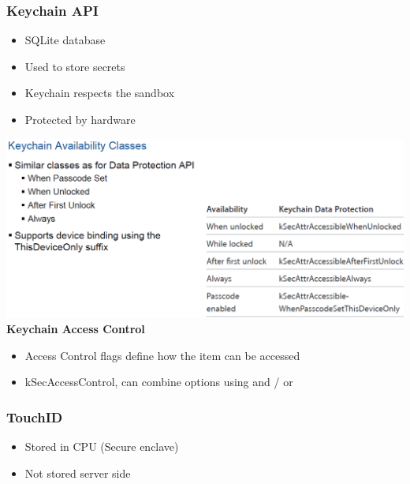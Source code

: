 \subsubsection{Keychain API}
\begin{itemize}
    \item SQLite database
    \item Used to store secrets
    \item Keychain respects the sandbox
    \item Protected by hardware
\end{itemize}
\includegraphics[width=\linewidth]{../img/keychain_classes.png}
\textbf{Keychain Access Control}
\begin{itemize}
    \item Access Control flags define how the item can be accessed
    \item kSecAccessControl, can combine options using and / or
\end{itemize}

\subsubsection{TouchID}
\begin{itemize}
    \item Stored in CPU (Secure enclave)
    \item Not stored server side
\end{itemize}

